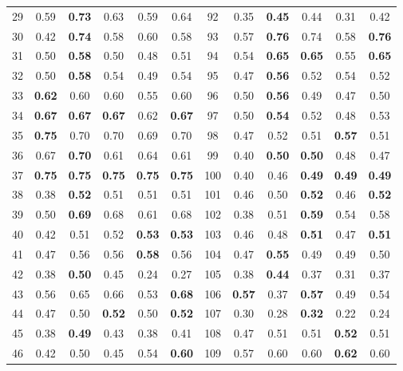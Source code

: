 \documentclass{article}
\begin{document}
{\begin{longtable}{cccccc@{\qquad}cccccc}
29 & 0.59 & \textbf{0.73} & 0.63 & 0.59 & 0.64 & 92 & 0.35 & \textbf{0.45} & 0.44 & 0.31 & 0.42 \\
30 & 0.42 & \textbf{0.74} & 0.58 & 0.60 & 0.58 & 93 & 0.57 & \textbf{0.76} & 0.74 & 0.58 & \textbf{0.76} \\
31 & 0.50 & \textbf{0.58} & 0.50 & 0.48 & 0.51 & 94 & 0.54 & \textbf{0.65} & \textbf{0.65} & 0.55 & \textbf{0.65} \\
32 & 0.50 & \textbf{0.58} & 0.54 & 0.49 & 0.54 & 95 & 0.47 & \textbf{0.56} & 0.52 & 0.54 & 0.52 \\
33 & \textbf{0.62} & 0.60 & 0.60 & 0.55 & 0.60 & 96 & 0.50 & \textbf{0.56} & 0.49 & 0.47 & 0.50 \\
34 & \textbf{0.67} & \textbf{0.67} & \textbf{0.67} & 0.62 & \textbf{0.67} & 97 & 0.50 & \textbf{0.54} & 0.52 & 0.48 & 0.53 \\
35 & \textbf{0.75} & 0.70 & 0.70 & 0.69 & 0.70 & 98 & 0.47 & 0.52 & 0.51 & \textbf{0.57} & 0.51 \\
36 & 0.67 & \textbf{0.70} & 0.61 & 0.64 & 0.61 & 99 & 0.40 & \textbf{0.50} & \textbf{0.50} & 0.48 & 0.47 \\
37 & \textbf{0.75} & \textbf{0.75} & \textbf{0.75} & \textbf{0.75} & \textbf{0.75} & 100 & 0.40 & 0.46 & \textbf{0.49} & \textbf{0.49} & \textbf{0.49} \\
38 & 0.38 & \textbf{0.52} & 0.51 & 0.51 & 0.51 & 101 & 0.46 & 0.50 & \textbf{0.52} & 0.46 & \textbf{0.52} \\
39 & 0.50 & \textbf{0.69} & 0.68 & 0.61 & 0.68 & 102 & 0.38 & 0.51 & \textbf{0.59} & 0.54 & 0.58 \\
40 & 0.42 & 0.51 & 0.52 & \textbf{0.53} & \textbf{0.53} & 103 & 0.46 & 0.48 & \textbf{0.51} & 0.47 & \textbf{0.51} \\
41 & 0.47 & 0.56 & 0.56 & \textbf{0.58} & 0.56 & 104 & 0.47 & \textbf{0.55} & 0.49 & 0.49 & 0.50 \\
42 & 0.38 & \textbf{0.50} & 0.45 & 0.24 & 0.27 & 105 & 0.38 & \textbf{0.44} & 0.37 & 0.31 & 0.37 \\
43 & 0.56 & 0.65 & 0.66 & 0.53 & \textbf{0.68} & 106 & \textbf{0.57} & 0.37 & \textbf{0.57} & 0.49 & 0.54 \\
44 & 0.47 & 0.50 & \textbf{0.52} & 0.50 & \textbf{0.52} & 107 & 0.30 & 0.28 & \textbf{0.32} & 0.22 & 0.24 \\
45 & 0.38 & \textbf{0.49} & 0.43 & 0.38 & 0.41 & 108 & 0.47 & 0.51 & 0.51 & \textbf{0.52} & 0.51 \\
46 & 0.42 & 0.50 & 0.45 & 0.54 & \textbf{0.60} & 109 & 0.57 & 0.60 & 0.60 & \textbf{0.62} & 0.60 \\

\end{longtable}}
\end{document}

